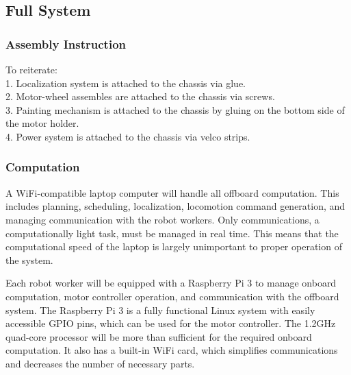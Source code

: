 
\subsection{Full System}
\label{sec:hardware_full_system}

\subsubsection{Assembly Instruction}
\label{sec:full_assemb}
To reiterate:\\
1. Localization system is attached to the chassis via glue.\\
2. Motor-wheel assembles are attached to the chassis via screws.\\
3. Painting mechanism is attached to the chassis by gluing on the bottom side of the motor holder.\\
4. Power system is attached to the chassis via velco strips.

\subsubsection{Computation}
\label{sec:full_computation}
A WiFi-compatible laptop computer will handle all offboard computation. This includes planning, scheduling, localization, locomotion command generation, and managing communication with the robot workers. Only communications, a computationally light task, must be managed in real time. This means that the computational speed of the laptop is largely unimportant to proper operation of the system.

Each robot worker will be equipped with a Raspberry Pi 3 to manage onboard computation, motor controller operation, and communication with the offboard system. The Raspberry Pi 3 is a fully functional Linux system with easily accessible GPIO pins, which can be used for the motor controller. The 1.2GHz quad-core processor will be more than sufficient for the required onboard computation. It also has a built-in WiFi card, which simplifies communications and decreases the number of necessary parts.